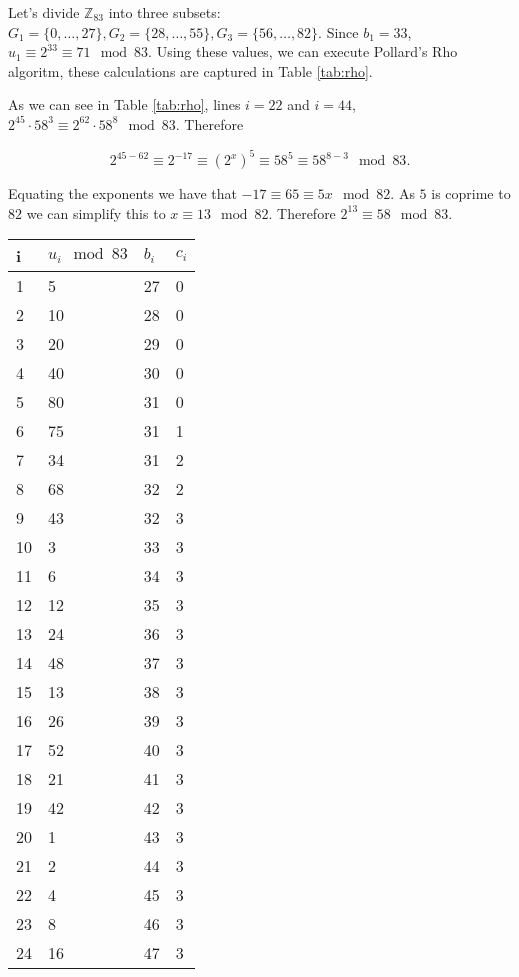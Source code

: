 Let's divide $\mathbb{Z}_{83}$ into three subsets: $G_1 = \{0, \dots, 27\}, G_2 = \{28, \dots, 55\}, G_3 = \{56, \dots, 82\}$. Since $b_1 = 33$, $u_1 \equiv 2^{33} \equiv 71 \mod 83$. Using these values, we can execute Pollard's Rho algoritm, these calculations are captured in Table \ref{tab:rho}.

As we can see in Table \ref{tab:rho}, lines $i=22$ and $i=44$, $2^{45} \cdot 58^3 \equiv 2^{62} \cdot 58^8 \mod 83$. Therefore 

\[2^{45-62} \equiv 2^{-17} \equiv (2^x)^5 \equiv 58^5 \equiv 58^{8-3} \mod 83.\]

Equating the exponents we have that $-17 \equiv 65 \equiv 5x \mod 82$. As $5$ is coprime to $82$ we can simplify this to $x \equiv 13 \mod 82$. Therefore $2^{13} \equiv 58 \mod 83$.

\begin{table}[P]
\begin{tabular}{l l l l}
i & $u_i \mod 83$ & $b_i$ & $c_i$ \\\hline
1 & 5 & 27 & 0 \\\hline
2 & 10 & 28 & 0 \\\hline
3 & 20 & 29 & 0 \\\hline
4 & 40 & 30 & 0 \\\hline
5 & 80 & 31 & 0 \\\hline
6 & 75 & 31 & 1 \\\hline
7 & 34 & 31 & 2 \\\hline
8 & 68 & 32 & 2 \\\hline
9 & 43 & 32 & 3 \\\hline
10 & 3 & 33 & 3 \\\hline
11 & 6 & 34 & 3 \\\hline
12 & 12 & 35 & 3 \\\hline
13 & 24 & 36 & 3 \\\hline
14 & 48 & 37 & 3 \\\hline
15 & 13 & 38 & 3 \\\hline
16 & 26 & 39 & 3 \\\hline
17 & 52 & 40 & 3 \\\hline
18 & 21 & 41 & 3 \\\hline
19 & 42 & 42 & 3 \\\hline
20 & 1 & 43 & 3 \\\hline
21 & 2 & 44 & 3 \\\hline
22 & 4 & 45 & 3 \\\hline
23 & 8 & 46 & 3 \\\hline
24 & 16 & 47 & 3 \\\hline

\end{tabular}
\end{table}
